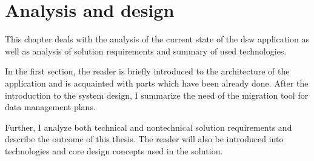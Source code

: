 \chapter{Analysis and design}

This chapter deals with the analysis of the current state of the \gls{dsw} application as well as analysis of solution requirements and summary of used technologies.

In the first section, the reader is briefly introduced to the architecture of the application and is acquainted with parts which have been already done.
After the introduction to the system design, I summarize the need of the migration tool for data management plans.

Further, I analyze both technical and nontechnical solution requirements and describe the outcome of this thesis.
The reader will also be introduced into technologies and core design concepts used in the solution.


